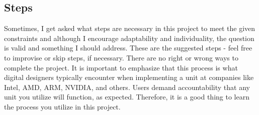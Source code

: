 \documentclass[times, 10pt, twocolumn]{IEEEtran}
\begin{document}
\subsection{Steps}

Sometimes, I get asked what steps are necessary in this project to
meet the given constraints and
although I encourage adaptability and individuality, the question is
valid and something I should address.  These are the suggested steps -
feel free to improvise or skip steps, if necessary.  There are no
right or wrong ways to complete the project.  It is important to
emphasize that this process is what digital designers typically
encounter when implementing a unit at companies like Intel, AMD, ARM,
NVIDIA, and others.  Users demand accountability that any unit you
utilize will function, as expected.  Therefore, it is a good thing to
learn the process you utilize in this project.
\end{document}
